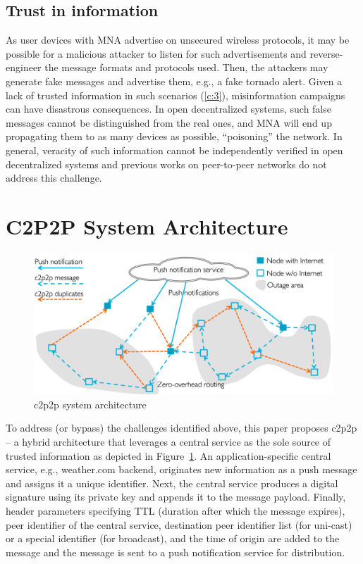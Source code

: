 \documentclass[conference]{IEEEtran}
\begin{document}
\subsection{Trust in information}
%
As user devices with MNA advertise on unsecured wireless protocols, it
may be possible for a malicious attacker to listen for such
advertisements and reverse-engineer the message formats and protocols
used. Then, the attackers may generate fake messages and advertise
them, e.g., a fake tornado alert. Given a lack of trusted information
in such scenarios (\ref{c:3}), misinformation campaigns can have
disastrous consequences.  In open decentralized systems, such false
messages cannot be distinguished from the real ones, and MNA will end
up propagating them to as many devices as possible, ``poisoning'' the
network. In general, veracity of such information cannot be
independently verified in open decentralized systems and previous works
on peer-to-peer networks do not address this challenge.
%
\section{C2P2P System Architecture}
\label{sec:architecture}
%
\begin{figure}[htbp]
\centerline{\includegraphics[width=\columnwidth]{figs/arch}}
\caption{c2p2p system architecture}
\label{fig:arch}
\end{figure}

To address (or bypass) the challenges identified above, this paper
proposes c2p2p -- a hybrid architecture that leverages a central
service as the sole source of trusted information as depicted in
Figure~\ref{fig:arch}. An application-specific central service, e.g.,
weather.com backend, originates new information as a push message and
assigns it a unique identifier. Next, the central service produces a
digital signature using its private key and appends it to the message
payload. Finally, header parameters specifying TTL (duration after
which the message expires), peer identifier of the central service,
destination peer identifier list (for uni-cast) or a special identifier
(for broadcast), and the time of origin are added to the message and
the message is sent to a push notification service for distribution.
\end{document}
